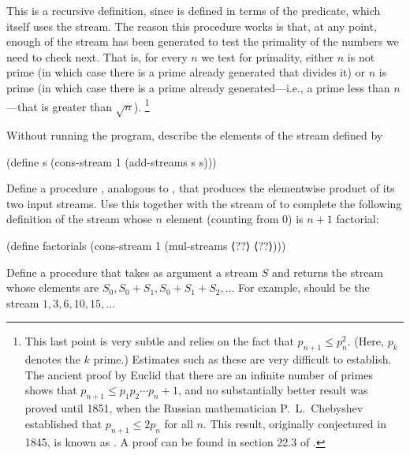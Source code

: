 This is a recursive definition, since  is defined in terms of the  predicate, which itself uses the  stream.
The reason this procedure works is that, at any point, enough of the  stream has been generated to test the primality of the numbers we need to check next.
That is, for every \( n \) we test for primality, either \( n \) is not prime (in which case there is a prime already generated that divides it) or \( n \) is prime (in which case there is a prime already generated---i.e., a prime less than \( n \)---that is greater than \( \sqrt{n} \)).%
\footnote{
	This last point is very subtle and relies on the fact that \( p_{n+1} ≤ p_n^2 \).
	(Here, \( p_k \) denotes the \( k \) prime.)
	Estimates such as these are very difficult to establish.
	The ancient proof by Euclid that there are an infinite number of primes shows that \( p_{n+1} ≤ p_1 p_2 \dotsm p_n + 1 \), and no substantially better result was proved until 1851, when the Russian mathematician P.~L.~Chebyshev established that \( p_{n+1} ≤ 2 p_n \) for all \( n \).
	This result, originally conjectured in 1845, is known as .
	A proof can be found in section 22.3 of .
}



\begin{exercise}
	\label{Exercise 3.53}
	Without running the program, describe the elements of the stream defined by 
	\begin{scheme}
	  (define s (cons-stream 1 (add-streams s s)))
	\end{scheme}
\end{exercise}



\begin{exercise}
	\label{Exercise 3.54}
	Define a procedure , analogous to , that produces the elementwise product of its two input streams.
	Use this together with the stream of  to complete the following definition of the stream whose \( n \) element (counting from \( 0 \)) is \( n + 1 \) factorial:
	\begin{scheme}
	  (define factorials
	    (cons-stream 1 (mul-streams ⟨??⟩ ⟨??⟩)))
	\end{scheme}
\end{exercise}



\begin{exercise}
	\label{Exercise 3.55}
	Define a procedure  that takes as argument a stream \( S \) and returns the stream whose elements are \( S_0, S_0 + S_1, S_0 + S_1 + S_2, \dotsc \)
	For example,  should be the stream \( 1, 3, 6, 10, 15, \dotsc \)
\end{exercise}



